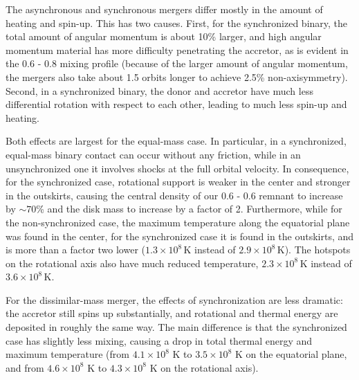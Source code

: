 The asynchronous and synchronous mergers differ mostly in the amount of heating and spin-up.  This has two causes.  First, for the synchronized binary, the total amount of angular momentum is about 10\% larger, and high angular momentum material has more difficulty penetrating the accretor, as is evident in the 0.6 - 0.8 {\Msun} mixing profile (because of the larger amount of angular momentum, the mergers also take about 1.5 orbits longer to achieve 2.5\% non-axisymmetry).  Second, in a synchronized binary, the donor and accretor have much less differential rotation with respect to each other, leading to much less spin-up and heating.

Both effects are largest for the equal-mass case.  In particular, in a synchronized, equal-mass binary contact can occur without any friction, while in an unsynchronized one it involves shocks at the full orbital velocity.  In consequence, for the synchronized case, rotational support is weaker in the center and stronger in the outskirts, causing the central density of our 0.6 - 0.6 {\Msun} remnant to increase by $\sim70$\% and the disk mass to increase by a factor of 2.  Furthermore, while for the non-synchronized case, the maximum temperature along the equatorial plane was found in the center, for the synchronized case it is found in the outskirts, and is more than a factor two lower ($1.3\times10^8\,$K instead of $2.9\times10^8\,$K).  The hotspots on the rotational axis also have much reduced temperature, $2.3\times 10^8$\,K instead of $3.6 \times 10^8$\,K.  

For the dissimilar-mass merger, the effects of synchronization are less dramatic: the accretor still spins up substantially, and rotational and thermal energy are deposited in roughly the same way.  The main difference is that the synchronized case has slightly less mixing, causing a drop in total thermal energy and maximum temperature (from $4.1\times10^8$ K to $3.5\times10^8$ K on the equatorial plane, and from $4.6\times10^8$ K to $4.3\times10^8$ K on the rotational axis).

